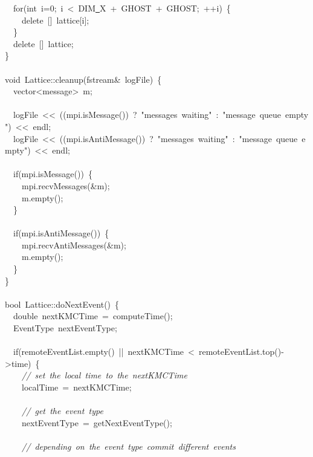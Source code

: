 {\ \ for(int\ i=0;\ i\ <{}\ DIM\underline\ X\ +\ GHOST\ +\ GHOST;\ ++i)\ \{\\
\ \ \ \ delete\ []\ lattice[i];\ \ \\
\ \ \}\\
\ \ delete\ []\ lattice;\\
\}\\
\ \\
void\ Lattice::cleanup(fstream\&\ logFile)\ \{\\
\ \ vector<{}message>{}\ m;\\
\ \\
\ \ logFile\ <{}<{}\ ((mpi.isMessage())\ ?\ "{}messages\ waiting"{}\ :\ "{}message\ queue\ empty"{})\ <{}<{}\ endl;\\
\ \ logFile\ <{}<{}\ ((mpi.isAntiMessage())\ ?\ "{}messages\ waiting"{}\ :\ "{}message\ queue\ empty"{})\ <{}<{}\ endl;\\
\ \ \\
\ \ if(mpi.isMessage())\ \{\\
\ \ \ \ mpi.recvMessages(\&m);\\
\ \ \ \ m.empty();\\
\ \ \}\\
\ \ \\
\ \ if(mpi.isAntiMessage())\ \{\\
\ \ \ \ mpi.recvAntiMessages(\&m);\\
\ \ \ \ m.empty();\\
\ \ \}\\
\}\\
\ \\
bool\ Lattice::doNextEvent()\ \{\\
\ \ double\ nextKMCTime\ =\ computeTime();\\
\ \ EventType\ nextEventType;\\
\ \\
\ \ if(remoteEventList.empty()\ ||\ nextKMCTime\ <{}\ remoteEventList.top()-{}>{}time)\ \{\\
\ \ \ \ \textsl{//\ set\ the\ local\ time\ to\ the\ nextKMCTime}\\
\ \ \ \ localTime\ =\ nextKMCTime;\\
\ \\
\ \ \ \ \textsl{//\ get\ the\ event\ type}\\
\ \ \ \ nextEventType\ =\ getNextEventType();\\
\ \\
\ \ \ \ \textsl{//\ depending\ on\ the\ event\ type\ commit\ different\ events}\\
}
